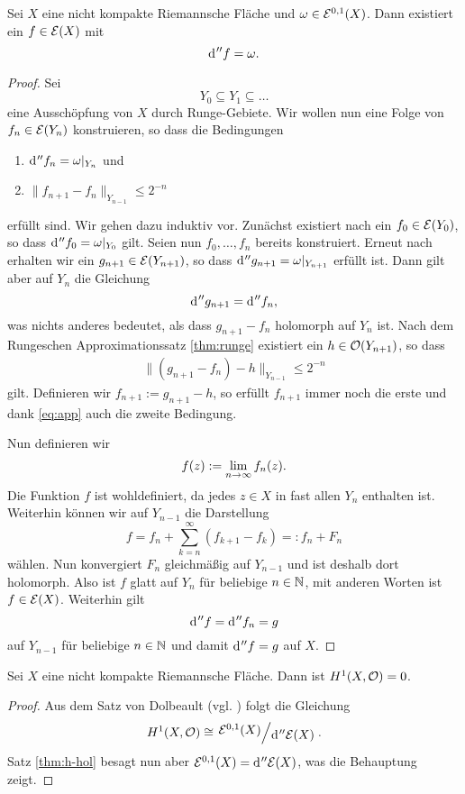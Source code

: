 \begin{thm}
  \label{thm:h-hol}
  Sei $X$ eine nicht kompakte Riemannsche Fläche und $\omega \in
  \mathcal{E}^{0,1}(X)$. Dann existiert ein $f \in \mathcal{E}(X)$ mit
  \[
  \d[''f] = \omega.
  \]
\end{thm}

\begin{proof}
  Sei
  \[
  Y_0 \subseteq Y_1 \subseteq \dots
  \]
  eine Ausschöpfung von $X$ durch Runge-Gebiete. Wir wollen nun eine
  Folge von $f_n \in \mathcal{E}(Y_n)$ konstruieren, so dass die Bedingungen
  \begin{enumerate}
  \item $\d[''f_n] = \omega|_{Y_n}$ und
  \item $\|f_{n+1} - f_n \|_{Y_{n-1}} \leq 2^{-n}$
  \end{enumerate}
  erfüllt sind. Wir gehen dazu induktiv vor. Zunächst existiert nach
  \cite[Kor. 14.16]{For} ein $f_0 \in \mathcal{E}(Y_0)$, so dass $\d[''f_0]
  = \omega|_{Y_0}$ gilt. Seien nun $f_0, \dots, f_n$ bereits
  konstruiert. Erneut nach \cite[Kor. 14.16]{For} erhalten wir ein
  $g_{n+1} \in \mathcal{E}(Y_{n+1})$, so dass $\d[''g_{n+1}] =
  \omega|_{Y_{n+1}}$ erfüllt ist. Dann gilt aber auf $Y_n$ die Gleichung
  \[
  \d['' g_{n+1}] = \d['' f_n],
  \]
  was nichts anderes bedeutet, als dass $g_{n+1} - f_n$ holomorph auf
  $Y_n$ ist. Nach dem Rungeschen Approximationssatz \ref{thm:runge}
  existiert ein $h \in \mathcal{O}(Y_{n+1})$, so dass
  \begin{align}
  \|(g_{n+1} - f_n) - h\|_{Y_{n-1}} \leq 2^{-n} \label{eq:app}
  \end{align}
  gilt. Definieren wir $f_{n+1} := g_{n+1} - h$, so erfüllt $f_{n+1}$
  immer noch die erste und dank \eqref{eq:app} auch die zweite
  Bedingung.

  Nun definieren wir
  \[
  f(z) := \lim_{n \rightarrow \infty} f_n(z).
  \]
  Die Funktion $f$ ist wohldefiniert, da jedes $z \in X$ in fast allen
  $Y_n$ enthalten ist. Weiterhin können wir auf $Y_{n-1}$ die Darstellung
  \[
  f = f_n + \sum_{k=n}^\infty (f_{k+1} - f_k) =: f_n + F_n
  \]
  wählen. Nun konvergiert $F_n$ gleichmäßig auf $Y_{n-1}$ und ist deshalb
  dort holomorph. Also ist $f$ glatt auf $Y_n$ für beliebige $n \in
  \mathbb{N}$, mit anderen Worten ist $f \in \mathcal{E}(X)$. Weiterhin gilt
  \[
  \d[''f] = \d['' f_n] = g
  \]
  auf $Y_{n-1}$ für beliebige $n \in \mathbb{N}$ und damit $\d[''f] = g$ auf $X$.
\end{proof}

\begin{cor}
  \label{cor:h-hol}
  Sei $X$ eine nicht kompakte Riemannsche Fläche. Dann ist $H^1(X,
  \mathcal{O}) = 0$.
\end{cor}

\begin{proof}
  Aus dem Satz von Dolbeault (vgl. \cite[Satz 15.14]{For}) folgt die
  Gleichung
  \[
  H^1(X, \hol) \cong \quot{\diff^{0,1}(X)}{\d['' \diff(X)]}.
  \]
  Satz \ref{thm:h-hol} besagt nun aber $\diff^{0,1}(X) =
  \d[''\diff(X)]$, was die Behauptung zeigt.
\end{proof}

